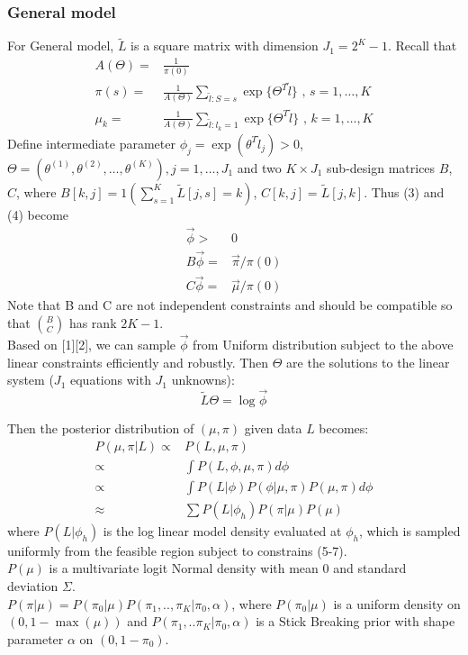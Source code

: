 \documentclass[11 pt, a4paper]{article}  %
\begin{document}
\subsubsection{General model}
For General model, $\tilde{L}$ is a square matrix with dimension $J_1 = 2^K-1$. Recall that 
\begin{align}
A(\Theta) = & \frac{1}{\pi(0)} \nonumber \\
\pi(s) = & \frac{1}{A(\Theta)} \sum_{\tilde{l}:S=s}\exp \{ \Theta^T \tilde{l}\}  \text{ , } s = 1,\ldots, K \\
\mu_k = & \frac{1}{A(\Theta)} \sum_{\tilde{l}:l_k=1}\exp \{ \Theta^T \tilde{l}\}  \text{ , } k = 1, \ldots, K
\end{align}
Define intermediate parameter $\phi_j = \exp(\theta^T\tilde{l}_j) >0$, $\Theta = (\theta^{(1)},\theta^{(2)}, \ldots, \theta^{(K)}), j= 1, \ldots, J_1$ and two $K \times J_1$ sub-design matrices $B$, $C$, where $B[k,j] = 1(\sum_{s=1}^K\tilde{L}[j,s]=k)$, $C[k,j] = \tilde{L}[j,k]$. Thus (3) and (4) become
\begin{align}
\vec{\phi} > & 0\\
B \vec{\phi} = & \vec{\pi}/\pi(0)\\ 
C \vec{\phi} = & \vec{\mu}/\pi(0)
\end{align}
Note that B and C are not independent constraints and should be compatible so that $\binom{B}{C}$ has rank $2K-1$.\\
Based on [1][2], we can sample $\vec{\phi}$ from Uniform distribution subject to the above linear constraints efficiently and robustly. Then $\Theta$ are the solutions to the linear system ($J_1$ equations with $J_1$ unknowns):
\[\tilde{L}\Theta = \log \vec{\phi}\]

Then the posterior distribution of $(\mu, \pi)$ given data $L$ becomes:
\begin{align*}
P(\mu, \pi |L) \propto & P(L, \mu, \pi) \\
\propto & \int P(L, \phi, \mu, \pi) d \phi \\
\propto & \int P(L | \phi) P(\phi | \mu,\pi) P(\mu, \pi) d \phi \\
\approx & \sum P(L | \phi_h) P(\pi | \mu) P(\mu)
\end{align*}
where $P(L | \phi_h)$ is the log linear model density evaluated at $\phi_h$, which is sampled uniformly from the feasible region subject to constrains (5-7).\\
$P(\mu)$ is a multivariate logit Normal density with mean $0$ and standard deviation $\Sigma$.\\
$P(\pi | \mu) = P(\pi_0 | \mu)P(\pi_1,.., \pi_K |\pi_0, \alpha)$, where $P(\pi_0 | \mu)$ is a uniform density on $(0, 1-\max(\mu))$ and $P(\pi_1,..\pi_K |\pi_0, \alpha)$ is a Stick Breaking prior with shape parameter $\alpha$ on $(0, 1-\pi_0)$.
\end{document}
